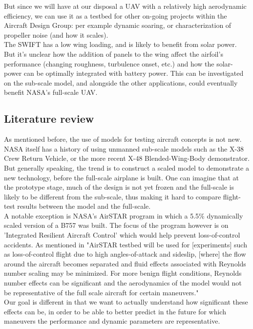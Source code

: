 \documentclass[titlepage,10pt]{article}
\begin{document}
But since we will have at our disposal a UAV with a relatively high aerodynamic efficiency, we can use it as a testbed for other on-going projects within the Aircraft Design Group: per example dynamic soaring, or characterization of propeller noise (and how it scales). \\

The SWIFT has a low wing loading, and is likely to benefit from solar power. But it's unclear how the addition of panels to the wing affect the airfoil's performance (changing roughness, turbulence onset, etc.) and how the solar-power can be optimally integrated with battery power. This can be investigated on the sub-scale model, and alongside the other applications, could eventually benefit NASA's full-scale UAV. 

\subsection{Literature review}
As mentioned before, the use of models for testing aircraft concepts is not new. NASA itself has a history of using unmanned sub-scale models such as the X-38 Crew Return Vehicle, or the more recent X-48 Blended-Wing-Body demonstrator. But generally speaking, the trend is to construct a scaled model to demonstrate a new technology, before the full-scale airplane is built. One can imagine that at the prototype stage, much of the design is not yet frozen and the full-scale is likely to be different from the sub-scale, thus making it hard to compare flight-test results between the model and the full-scale.\\

A notable exception is NASA's AirSTAR program in which a 5.5\% dynamically scaled version of a B757 was built. The focus of the program however is on 'Integrated Resilient Aircraft Control' which would help prevent loss-of-control accidents. As mentioned in \cite{Airstar} "AirSTAR testbed will be used for [experiments] such as loss-of-control flight due to high angles-of-attack and sideslip, [where] the flow around the aircraft becomes separated and fluid effects associated with Reynolds number scaling may be minimized. For more benign flight conditions, Reynolds number effects can be significant and the aerodynamics of the model would not be representative of the full scale aircraft for certain maneuvers."\\

Our goal is different in that we want to actually understand how significant these effects can be, in order to be able to better predict in the future for which maneuvers the performance and dynamic parameters are representative.
\end{document}
